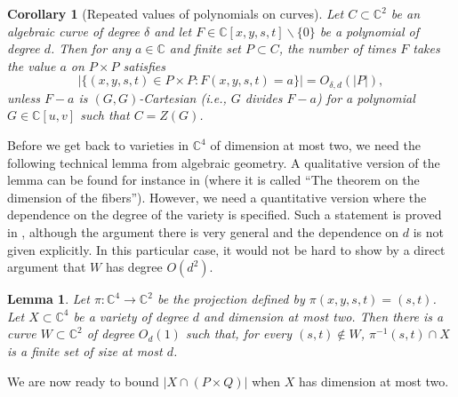 \documentclass{daj}
\newtheorem{corollary}[theorem]{Corollary}
\newtheorem{lemma}[theorem]{Lemma}
\theoremstyle{definition}
\newcommand{\C}{\mathbb C}
\begin{document}
\begin{corollary}[Repeated values of polynomials on curves]\label{cor:repvaloncurves}
Let $C\subset \C^2$ be an algebraic curve of degree $\delta$ and let $F\in \C[x,y,s,t]\backslash\{0\}$ be a polynomial of degree $d$.
Then for any $a\in \C$ and finite set $P\subset C$,
the number of times $F$ takes the value $a$ on $P\times P$ satisfies
\[\left|\{(x,y,s,t)\in P\times P: F(x,y,s,t) = a\}\right| = O_{\delta,d}(|P|),\]
unless $F-a$ is $(G,G)$-Cartesian (i.e., $G$ divides $F-a$) for a polynomial $G\in \C[u,v]$ such that $C = Z(G)$.
\end{corollary}

Before we get back to varieties in $\C^4$ of dimension at most two, we need the following technical lemma from algebraic geometry.
A qualitative version of the lemma can be found for instance in \cite[Theorem I.6.3.7]{Shaf} (where it is called ``The theorem on the dimension of the fibers'').
However, we need a quantitative version where the dependence on the degree of the variety is specified. 
Such a statement is proved in \cite[Lemma 3.7]{BGT}, 
although the argument there is very general and the dependence on $d$ is not given explicitly.
In this particular case, it would not be hard to show by a direct argument that $W$ has degree $O(d^2)$.

\begin{lemma}\label{lem:fibers}
Let $\pi:\C^4\to \C^2$ be the projection defined by $\pi(x,y,s,t) = (s,t)$.
Let $X\subset \C^4$ be a variety of degree $d$ and dimension at most two.
Then there is a curve $W\subset \C^2$ of degree $O_d(1)$ such that, for every $(s,t)\not\in W$, $\pi^{-1}(s,t)\cap X$ is a finite set of size at most $d$.
\end{lemma}

We are now ready to bound $|X\cap (P\times Q)|$ when $X$ has dimension at most two.
\end{document}
